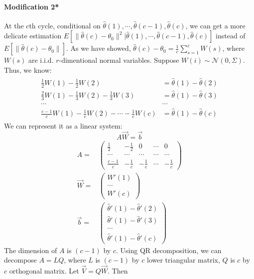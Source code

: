 \documentclass{article}
\theoremstyle{plain}
\theoremstyle{definition}
\begin{document}
\paragraph{Modification 2*}
At the $c$th cycle, conditional on $\hat{\theta}(1), \cdots, \hat{\theta}(c-1),\hat{\theta}(c)$, we can get a more delicate estimation $E[\|\hat{\theta}(c)-\theta_0\|^2 | \hat{\theta}(1), \cdots, \hat{\theta}(c-1),\hat{\theta}(c)]$ instead of $E[\|\hat{\theta}(c)-\theta_0\|]$.
As we have showed, $\hat{\theta}(c)-\theta_0=\frac{1}{c}\sum_{s=1}^c W(s)$, where $W(s)$ are i.i.d. $r$-dimentional normal variables. Suppose $W(i)\sim\mathcal{N}(0, \Sigma)$. Thus, we know:
\begin{align*}
\begin{array}{ll}
\frac{1}{2}W(1)-\frac{1}{2}W(2)&=\hat{\theta}(1)-\hat{\theta}(2)\\
\frac{2}{3}W(1)-\frac{1}{3}W(2)-\frac{1}{3}W(3)&=\hat{\theta}(1)-\hat{\theta}(3)\\
\cdots &\cdots\\
\frac{c-1}{c}W(1)-\frac{1}{c}W(2)-\cdots -\frac{1}{c}W(c)&=\hat{\theta}(1)-\hat{\theta}(c)
\end{array}
\end{align*}
We can represent it as a linear system:
\[A\vec{W}=\vec{b}\]
\begin{align*}
A=&\left(
\begin{array}{ccccc}
\frac{1}{2}&-\frac{1}{2}&0&\cdots&0\\
\cdots&\cdots&\cdots&\cdots&\cdots\\
\frac{c-1}{c}&-\frac{1}{c}&-\frac{1}{c}&\cdots&-\frac{1}{c}
\end{array}\right)\\
\vec{W}=&\left(\begin{array}{c}W'(1)\\ \cdots \\ W'(c)\end{array}\right)\\
\vec{b}=&\left(\begin{array}{c}
\hat{\theta}'(1)-\hat{\theta}'(2)\\
\hat{\theta}'(1)-\hat{\theta}'(3)\\
\cdots\\
\hat{\theta}'(1)-\hat{\theta}'(c)
\end{array}\right)
\end{align*}
The dimension of $A$ is $(c-1)$ by $c$. Using QR decomposition, we can decompose $A=LQ$, where $L$ is $(c-1)$ by $c$ lower triangular matrix, $Q$ is $c$ by $c$ orthogonal matrix. Let $\vec{V}=Q\vec{W}$. Then 
\end{document}
